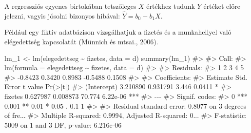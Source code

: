 \documentclass[
  letterpaper,
]{krantz}
\makeatletter
\newenvironment{Shaded}{\begin{snugshade}}{\end{snugshade}}
\newcommand{\AttributeTok}[1]{\textcolor[rgb]{0.40,0.45,0.13}{#1}}
\newcommand{\CommentTok}[1]{\textcolor[rgb]{0.37,0.37,0.37}{#1}}
\newcommand{\FunctionTok}[1]{\textcolor[rgb]{0.28,0.35,0.67}{#1}}
\newcommand{\NormalTok}[1]{\textcolor[rgb]{0.00,0.23,0.31}{#1}}
\newcommand{\OtherTok}[1]{\textcolor[rgb]{0.00,0.23,0.31}{#1}}
\newcommand{\SpecialCharTok}[1]{\textcolor[rgb]{0.37,0.37,0.37}{#1}}
\newcommand{\StringTok}[1]{\textcolor[rgb]{0.13,0.47,0.30}{#1}}
\newenvironment{kframe}{%
\medskip{}
\setlength{\fboxsep}{.8em}
 \def\at@end@of@kframe{}%
 \ifinner\ifhmode%
  \def\at@end@of@kframe{\end{minipage}}%
  \begin{minipage}{\columnwidth}%
 \fi\fi%
 \def\FrameCommand##1{\hskip\@totalleftmargin \hskip-\fboxsep
 \colorbox{shadecolor}{##1}\hskip-\fboxsep
     \hskip-\linewidth \hskip-\@totalleftmargin \hskip\columnwidth}%
 \MakeFramed {\advance\hsize-\width
   \@totalleftmargin\z@ \linewidth\hsize
   \@setminipage}}%
 {\par\unskip\endMakeFramed%
 \at@end@of@kframe}
\renewenvironment{Shaded}{\begin{kframe}}{\end{kframe}}
\makeatother
\begin{document}
A regressziós egyenes birtokában tetszőleges \(X\) értékhez tudunk \(Y\)
értéket előre jelezni, vagyis jósolni bizonyos hibával:
\(\hat{Y}=b_0+b_1 X\).

Például egy fiktív adatbázison vizsgálhatjuk a fizetés és a munkahellyel
való elégedettség kapcsolatát (Münnich és mtsai., 2006).

\begin{Shaded}
\end{Shaded}

\begin{Shaded}
\begin{Highlighting}[]
\NormalTok{lm\_1 }\OtherTok{\textless{}{-}} \FunctionTok{lm}\NormalTok{(elegedettseg }\SpecialCharTok{\textasciitilde{}}\NormalTok{ fizetes, }\AttributeTok{data =}\NormalTok{ d)}
\FunctionTok{summary}\NormalTok{(lm\_1)}
\CommentTok{\#\textgreater{} }
\CommentTok{\#\textgreater{} Call:}
\CommentTok{\#\textgreater{} lm(formula = elegedettseg \textasciitilde{} fizetes, data = d)}
\CommentTok{\#\textgreater{} }
\CommentTok{\#\textgreater{} Residuals:}
\CommentTok{\#\textgreater{}       1       2       3       4       5 }
\CommentTok{\#\textgreater{} {-}0.8423  0.3420  0.8983 {-}0.5488  0.1508 }
\CommentTok{\#\textgreater{} }
\CommentTok{\#\textgreater{} Coefficients:}
\CommentTok{\#\textgreater{}             Estimate Std. Error t value Pr(\textgreater{}|t|)    }
\CommentTok{\#\textgreater{} (Intercept) 3.210890   0.931791   3.446   0.0411 *  }
\CommentTok{\#\textgreater{} fizetes     0.627987   0.008873  70.774 6.22e{-}06 ***}
\CommentTok{\#\textgreater{} {-}{-}{-}}
\CommentTok{\#\textgreater{} Signif. codes:  }
\CommentTok{\#\textgreater{} 0 \textquotesingle{}***\textquotesingle{} 0.001 \textquotesingle{}**\textquotesingle{} 0.01 \textquotesingle{}*\textquotesingle{} 0.05 \textquotesingle{}.\textquotesingle{} 0.1 \textquotesingle{} \textquotesingle{} 1}
\CommentTok{\#\textgreater{} }
\CommentTok{\#\textgreater{} Residual standard error: 0.8077 on 3 degrees of fre...}
\CommentTok{\#\textgreater{} Multiple R{-}squared:  0.9994, Adjusted R{-}squared:  0...}
\CommentTok{\#\textgreater{} F{-}statistic:  5009 on 1 and 3 DF,  p{-}value: 6.216e{-}06}
\end{Highlighting}
\end{Shaded}
\end{document}
